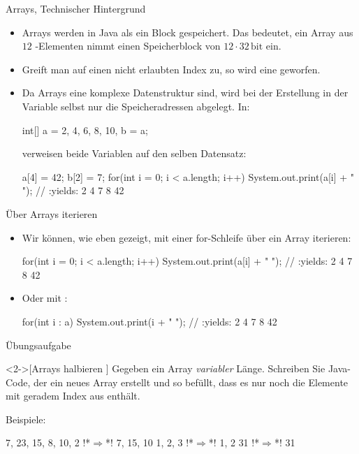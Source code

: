 \begin{frame}[fragile]{Arrays, Technischer Hintergrund}
    \begin{itemize}[<+(1)->]
        \widei
        \item Arrays werden in Java als ein Block gespeichert.\pause{} Das bedeutet, ein Array aus \(12\) -Elementen nimmt einen Speicherblock von \(12 \cdot 32\,\text{bit}\) ein.
        \item Greift man auf einen nicht erlaubten Index zu,\pause{} so wird eine  geworfen.
        \item Da Arrays eine komplexe Datenstruktur sind, wird bei der Erstellung in der Variable selbst nur die Speicheradressen abgelegt.\pause{} In:\pause{}
\begin{plainjava}
int[] a = {2, 4, 6, 8, 10}, b = a;
\end{plainjava}
        \pause{}verweisen beide Variablen auf den selben Datensatz:\pause{}
\begin{plainjava}
a[4] = 42; b[2] = 7;
for(int i = 0; i < a.length; i++)
    System.out.print(a[i] + " "); // :yields: 2 4 7 8 42
\end{plainjava}
    \end{itemize}
\end{frame}

\begin{frame}[fragile]{Über Arrays iterieren}
    \begin{itemize}[<+(1)->]
        \widei
        \item Wir können,\pause{} wie eben gezeigt,\pause{} mit einer for-Schleife über ein Array iterieren:\pause{}
\begin{plainjava}
for(int i = 0; i < a.length; i++) {
    System.out.print(a[i] + " "); // :yields: 2 4 7 8 42
}
\end{plainjava}
        \item Oder mit :\pause{}
\begin{plainjava}
for(int i : a) {
    System.out.print(i + " "); // :yields: 2 4 7 8 42
}
\end{plainjava}
    \end{itemize}
\end{frame}


\ifull
\begin{frame}[c,fragile]{Übungsaufgabe}
\begin{exercise}<2->[Arrays halbieren ]
    Gegeben ein Array  \emph{variabler} Länge. Schreiben Sie Java-Code, der ein neues Array  erstellt und so befüllt, dass es nur noch die Elemente mit geradem Index aus  enthält.\par\pause{}
    Beispiele:\pause
\begin{plainjava}
{7, 23, 15, 8, 10, 2} !*$\Rightarrow$*! {7, 15, 10}
{1, 2, 3} !*$\Rightarrow$*! {1, 2}
{31} !*$\Rightarrow$*! {31}
\end{plainjava}
\end{exercise}
\end{frame}

